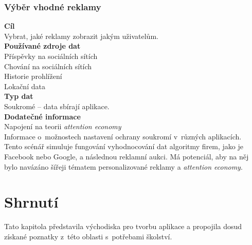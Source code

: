 \subsubsection*{Výběr vhodné reklamy} 
\textbf{Cíl}\\
Vybrat, jaké reklamy zobrazit jakým uživatelům.\\
\textbf{Používané zdroje dat}\\
Příspěvky na sociálních sítích\\
Chování na sociálních sítích\\
Historie prohlížení\\
Lokační data\\
\textbf{Typ dat}\\
Soukromé -- data sbírají aplikace.\\
\textbf{Dodatečné informace}\\
Napojení na teorii \textit{attention economy}\\
Informace o~možnostech nastavení ochrany soukromí v~různých aplikacích.\\

Tento scénář simuluje fungování vyhodnocování dat algoritmy firem, jako je Facebook nebo Google, a následnou reklamní aukci. Má potenciál, aby na něj bylo navázáno šířeji tématem personalizované reklamy a \textit{attention economy}. 

\section*{Shrnutí}
Tato kapitola představila východiska pro tvorbu aplikace a propojila dosud získané poznatky z~této oblasti s~potřebami školství.  